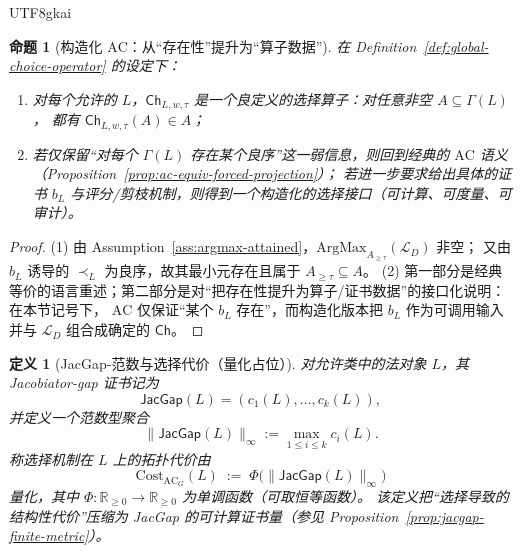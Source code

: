\documentclass[12pt]{article}
\newtheorem{definition}{定义}[section]
\newtheorem{proposition}{命题}[section]
\newcommand{\JacGap}{\ensuremath{\mathsf{JacGap}}}
\newcommand{\AC}{\ensuremath{\mathrm{AC}}}
\begin{document}
\begin{CJK*}{UTF8}{gkai}
\begin{proposition}[构造化 $\AC$：从“存在性”提升为“算子数据”]
\label{prop:ac-as-operator-data}
在 Definition~\ref{def:global-choice-operator} 的设定下：
\begin{enumerate}
  \item 对每个允许的 $L$，$\mathsf{Ch}_{L,w,\tau}$ 是一个良定义的选择算子：对任意非空 $A\subseteq\Gamma(L)$，
        都有 $\mathsf{Ch}_{L,w,\tau}(A)\in A$；
  \item 若仅保留“对每个 $\Gamma(L)$ 存在某个良序”这一弱信息，则回到经典的 $\AC$ 语义（Proposition~\ref{prop:ac-equiv-forced-projection}）；
        若进一步要求给出具体的证书 $b_L$ 与评分/剪枝机制，则得到一个\emph{构造化}的选择接口（可计算、可度量、可审计）。
\end{enumerate}
\end{proposition}

\begin{proof}
(1) 由 Assumption~\ref{ass:argmax-attained}，$\mathrm{ArgMax}_{A_{\ge\tau}}(\mathcal{L}_D)$ 非空；
又由 $b_L$ 诱导的 $\prec_L$ 为良序，故其最小元存在且属于 $A_{\ge\tau}\subseteq A$。
(2) 第一部分是经典等价的语言重述；第二部分是对“把存在性提升为算子/证书数据”的接口化说明：在本节记号下，
$\AC$ 仅保证“某个 $b_L$ 存在”，而构造化版本把 $b_L$ 作为可调用输入并与 $\mathcal{L}_D$ 组合成确定的 $\mathsf{Ch}$。
\end{proof}

\begin{definition}[JacGap-范数与选择代价（量化占位）]
\label{def:ac-cost-jacgap}
对允许类中的法对象 $L$，其 Jacobiator-gap 证书记为
\[
  \JacGap(L)=(c_1(L),\dots,c_k(L)),
\]
并定义一个范数型聚合
\[
  \|\JacGap(L)\|_{\infty}:=\max_{1\le i\le k} c_i(L).
\]
称选择机制在 $L$ 上的\emph{拓扑代价}由
\[
  \mathrm{Cost}_{\AC_G}(L)\;:=\;\Phi\bigl(\|\JacGap(L)\|_{\infty}\bigr)
\]
量化，其中 $\Phi:\mathbb{R}_{\ge 0}\to\mathbb{R}_{\ge 0}$ 为单调函数（可取恒等函数）。
该定义把“选择导致的结构性代价”压缩为 JacGap 的可计算证书量（参见 Proposition~\ref{prop:jacgap-finite-metric}）。
\end{definition}


\end{CJK*}
\end{document}
